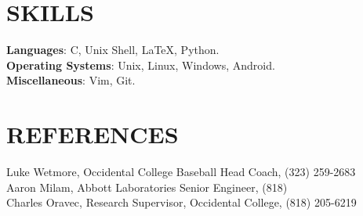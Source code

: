 \documentclass[margin]{res}
\begin{document}
\begin{resume}
\section{SKILLS}

\textbf{Languages}: C, Unix Shell, \LaTeX, Python.
\\
\textbf{Operating Systems}: Unix, Linux, Windows, Android.
\\
\textbf{Miscellaneous}: Vim, Git.

\section{REFERENCES}
Luke Wetmore, Occidental College Baseball Head Coach, (323) 259-2683 \\
Aaron Milam, Abbott Laboratories Senior Engineer, (818) \\
Charles Oravec, Research Supervisor, Occidental College, (818) 205-6219
\end{resume}
\end{document}
